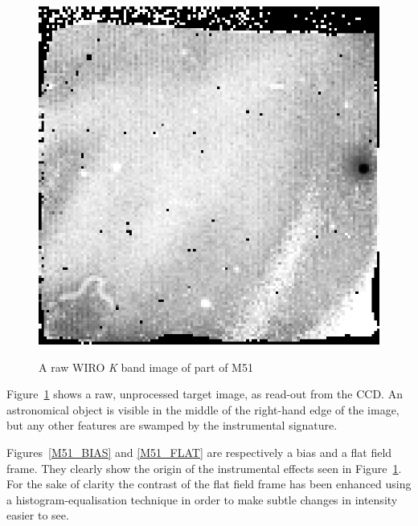 \documentclass[twoside,11pt]{article}
\begin{document}
\begin{figure}[htbp]
   \centering
   \includegraphics[totalheight=3.5in]{sc5_m51_raw.ps}
   \begin{quote}
   \caption{A raw WIRO {\it K}\/ band image of part of M51
   \label{M51_RAW} }
   \end{quote}
\end{figure}

Figure~\ref{M51_RAW} shows a raw, unprocessed target image, as read-out from
the CCD.  An astronomical object is visible in the middle of the right-hand
edge of the image, but any other features are swamped by the instrumental
signature.

Figures~\ref{M51_BIAS} and \ref{M51_FLAT} are respectively a bias and a
flat field frame.  They clearly show the origin of the instrumental effects
seen in Figure~\ref{M51_RAW}.  For the sake of clarity the contrast of the
flat field frame has been enhanced using a histogram-equalisation
technique in order to make subtle changes in intensity easier to see.
\end{document}
